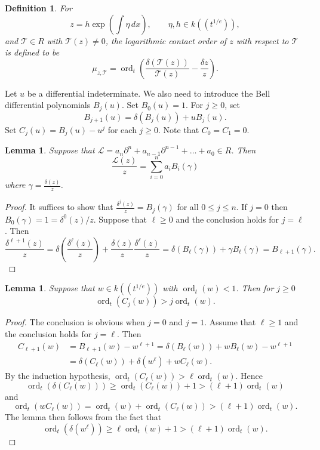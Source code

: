 \documentclass{article}
\newtheorem{lemma}[theorem]{Lemma}
\newtheorem{definition}[theorem]{Definition}
\DeclareMathOperator{\ord}{ord}
\newcommand{\dd}{\delta}
\newcommand{\calL}{{\mathcal{L}}}
\newcommand{\calT}{{\mathcal{T}}}
\begin{document}
\begin{definition}
  \label{DEF:contact_order}
For
\[
  z=h\exp\left(\int \eta\,dx\right),\qquad \eta,h\in k((t^{1/e})),
\]
and \(\calT\in R\) with \(\calT(z)\ne0\), the logarithmic contact order  of $z$ with respect to $\calT$ is defined to be
\[
  \mu_{z,\calT}=
  \ord_t\left(\frac{\dd(\calT(z))}{\calT(z)}-\frac{\dd z}{z}\right).
\]
\end{definition}
Let $u$ be a differential indeterminate. We also need to introduce the Bell differential polynomials $B_j(u)$. 
Set $B_0(u)=1$. For $j\geq 0$, set
$$
    B_{j+1}(u)=\delta(B_j(u))+uB_j(u).
$$
Set $C_j(u)=B_j(u)-u^j$ for each $j\geq 0$. Note that $C_0=C_1=0$.
\begin{lemma}
  \label{LM:Bellformula}
Suppose that $\calL=a_n\partial^n+a_{n-1}\partial^{n-1}+\dots+a_0\in R$.
Then 
$$
   \frac{\calL(z)}{z}=\sum_{i=0}^n a_i B_i(\gamma)
$$
where $\gamma=\frac{\delta(z)}{z}$.
\end{lemma}
\begin{proof}
  It suffices to show that $\frac{\delta^j(z)}{z}=B_j(\gamma)$ for all $0\leq j \leq n$.
  If $j=0$ then $B_0(\gamma)=1=\delta^0(z)/z$. Suppose that $\ell\geq 0$ and 
  the conclusion holds for $j=\ell$. Then 
  $$
    \frac{\delta^{\ell+1}(z)}{z}=\delta\left(\frac{\delta^\ell(z)}{z}\right)
    +\frac{\delta(z)}{z}\frac{\delta^\ell(z)}{z}=\delta(B_\ell(\gamma))+\gamma B_\ell(\gamma)=B_{\ell+1}(\gamma).
  $$
\end{proof}
\begin{lemma}
  \label{LM:orderofBell1}
  Suppose that $w\in k((t^{1/e}))$ with $\ord_t(w)<1$. Then for $j\geq 0$
  $$
     \ord_t(C_j(w))>j\ord_t(w).
  $$
\end{lemma}
\begin{proof}
  The conclusion is obvious when $j=0$ and $j=1$. Assume that $\ell\geq 1$ and 
  the conclusion holds for $j=\ell$. Then 
  \begin{align*}
     C_{\ell+1}(w)&=B_{\ell+1}(w)-w^{\ell+1}=\delta(B_\ell(w))+wB_\ell(w)-w^{\ell+1}\\
     &=\delta(C_\ell(w))+\delta(w^\ell)+wC_\ell(w).
  \end{align*}
  By the induction hypothesis, $\ord_t(C_\ell(w))>\ell\ord_t(w)$. Hence 
  $$
    \ord_t(\delta(C_\ell(w)))\geq \ord_t(C_\ell(w))+1>(\ell+1)\ord_t(w)
  $$
  and 
  $$
    \ord_t(w C_\ell(w))=\ord_t(w)+\ord_t(C_\ell(w))>(\ell+1)\ord_t(w).
  $$
  The lemma then follows from the fact that  
  $$
     \ord_t(\delta(w^\ell))\geq \ell\ord_t(w)+1>(\ell+1)\ord_t(w).
  $$
\end{proof}
\end{document}
